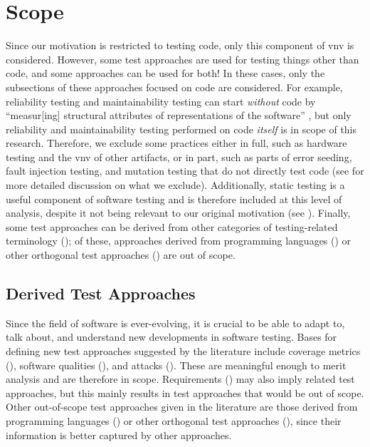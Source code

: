 \section{Scope}
\label{scope}

Since our motivation is restricted to testing code, only this component of
\acf{vnv} is considered. However, some test approaches
are used for testing things other than code, and some approaches can be used
for both! In these cases, only the subsections of these approaches focused on
code are considered. For example, reliability testing and maintainability
testing can start \emph{without} code by ``measur[ing] structural attributes
of representations of the software'' \citep[p.~18]{FentonAndPfleeger1997}, but
only reliability and maintainability testing performed on code \emph{itself} is
in scope of this research. Therefore, we exclude some practices either in full,
such as hardware testing and the \acs{vnv} of other artifacts, or in part, such
as parts of error seeding, fault injection testing, and mutation testing that
do not directly test code (see  for more detailed discussion
on what we exclude). Additionally, static testing is a useful component of
software testing and is therefore included at this level of analysis, despite
it not being relevant to our original motivation (see ).
\ifnotpaper Finally, some test approaches can
    be derived from other categories of testing-related terminology
    (); of these, approaches derived from programming
    languages () or other orthogonal test approaches
    () are out of scope. \fi

\ifnotpaper

    \subsection{Derived Test Approaches}
    \label{derived-tests}

    Since the field of software is ever-evolving, it is crucial to be able to
    adapt to, talk about, and understand new developments in software testing.
    Bases for defining new test approaches suggested by the
    literature include coverage metrics (), software qualities
    (), and attacks (). These are meaningful
    enough to merit analysis and are therefore in scope. Requirements
    () may also imply related test approaches, but this mainly
    results in test approaches that would be out of scope. Other out-of-scope
    test approaches given in the literature are those derived from programming
    languages () or other orthogonal test approaches
    (), since their information is better captured by other
    approaches.

